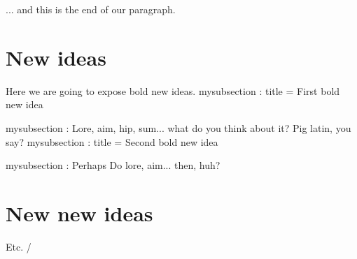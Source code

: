 \def\subsection#1{%
  \setparameter mysubsection : title = {#1}\par
  \executeparameter mysubsection :}


... and this is the end of our paragraph.
\section{New ideas}
Here we are going to expose bold new ideas.
\subsection{First bold new idea}
Lore, aim, hip, sum... what do you think about
it? Pig latin, you say?
\subsection{Second bold new idea}
Perhaps Do lore, aim... then, huh?
\section{New new ideas}
Etc.
\Example/

\finishpdffile
\bye
